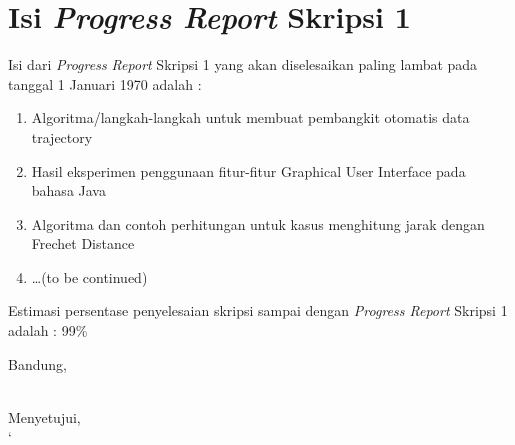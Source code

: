 \documentclass[a4paper,twoside]{article}
\begin{document}
\section{Isi {\it Progress Report} Skripsi 1}
Isi dari {\it Progress Report} Skripsi 1 yang akan diselesaikan paling lambat pada tanggal 1 Januari 1970 adalah :
\begin{enumerate}
	\item Algoritma/langkah-langkah untuk membuat pembangkit otomatis data trajectory
	\item Hasil eksperimen penggunaan fitur-fitur Graphical User Interface pada bahasa Java
	\item Algoritma dan contoh perhitungan untuk kasus menghitung jarak dengan Frechet Distance
	\item \ldots (to be continued)
\end{enumerate}
Estimasi persentase penyelesaian skripsi sampai dengan {\it Progress Report} Skripsi 1 adalah : 99\%
\vspace{1.5cm}

\centering Bandung, \tanggal\\
\vspace{2cm} \nama \\ 
\vspace{1cm}

Menyetujui, \\
`
\end{document}

